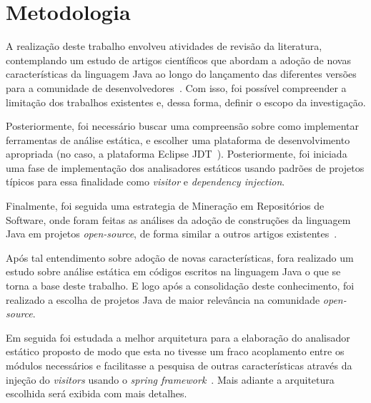 %


\section{Metodologia}
    
    A realização deste trabalho envolveu atividades de revisão da literatura, contemplando um estudo 
    de artigos científicos que abordam a adoção de novas características da linguagem Java ao longo do 
    lançamento das diferentes versões para a comunidade de desenvolvedores~\cite{Schaefer:ACM2009, Dyer:2013, Parnin:ACM2011, Overbey:2009, Dyer:ACM2014, Bracha:ACM1998, bonifacio:scam2015}. Com isso, foi 
    possível compreender a limitação dos trabalhos existentes e, dessa forma, definir o escopo da 
    investigação. 
    
    Posteriormente, foi necessário buscar uma compreensão sobre como implementar ferramentas de 
    análise estática, e escolher uma plataforma de desenvolvimento apropriada (no caso, a plataforma 
    Eclipse JDT~\cite{EclipseJDT}). Posteriormente, foi iniciada uma fase de implementação dos analisadores estáticos usando padrões de projetos típicos para essa finalidade como  \textit{visitor} e \textit{dependency injection}.
    
     Finalmente, foi seguida uma estrategia de Mineração em Repositórios de Software, onde foram 
     feitas as análises da adoção de construções da linguagem Java em projetos \textit{open-source}, de forma 
     similar a outros artigos existentes~\cite{Schaefer:ACM2010,pinto-jss:2015,donovan:2004,dinklage:2004, Schaefer:ACM2009, Schaefer:ACM2010, Overbey:2009, Wichmann95industrialperspective, Ayewah:2008:USA:1439186.1439221, bracha1998gj}. 
     
	
	Após tal entendimento sobre adoção de novas características, fora realizado um estudo sobre análise estática em códigos escritos na linguagem Java o que se torna a base deste trabalho. E logo após a consolidação deste conhecimento, foi realizado a escolha de projetos Java de maior relevância na comunidade \textit{open-source}.
	
	Em seguida foi estudada a melhor arquitetura para a elaboração do analisador estático proposto de modo que esta no tivesse um fraco acoplamento entre os módulos necessários e facilitasse a pesquisa de outras características através da injeção do \textit{visitors} \cite{Gamma:1995} usando o \textit{spring framework}~\cite{SPRING_REF}. Mais adiante a arquitetura escolhida será exibida com mais detalhes.
